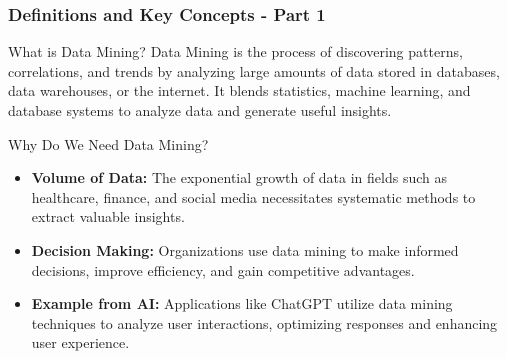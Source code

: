 \documentclass[aspectratio=169]{beamer}
\begin{document}
\begin{frame}[fragile]
    \frametitle{Definitions and Key Concepts - Part 1}
    \begin{block}{What is Data Mining?}
        Data Mining is the process of discovering patterns, correlations, and trends by analyzing large amounts of data stored in databases, data warehouses, or the internet. 
        It blends statistics, machine learning, and database systems to analyze data and generate useful insights.
    \end{block}
    
    \begin{block}{Why Do We Need Data Mining?}
        \begin{itemize}
            \item \textbf{Volume of Data:} The exponential growth of data in fields such as healthcare, finance, and social media necessitates systematic methods to extract valuable insights.
            \item \textbf{Decision Making:} Organizations use data mining to make informed decisions, improve efficiency, and gain competitive advantages.
            \item \textbf{Example from AI:} Applications like ChatGPT utilize data mining techniques to analyze user interactions, optimizing responses and enhancing user experience.
        \end{itemize}
    \end{block}
\end{frame}
\end{document}
